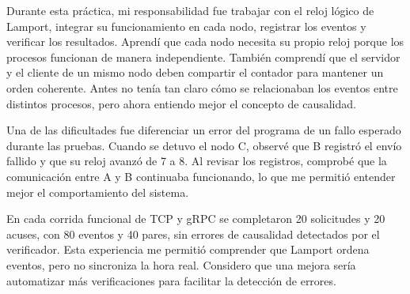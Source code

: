 Durante esta práctica, mi responsabilidad fue trabajar con el reloj lógico de
Lamport, integrar su funcionamiento en cada nodo, registrar los eventos y verificar
los resultados. Aprendí que cada nodo necesita su propio reloj porque los procesos
funcionan de manera independiente. También comprendí que el servidor y el cliente
de un mismo nodo deben compartir el contador para mantener un orden coherente.
Antes no tenía tan claro cómo se relacionaban los eventos entre distintos procesos,
pero ahora entiendo mejor el concepto de causalidad.

Una de las dificultades fue diferenciar un error del programa de un fallo esperado
durante las pruebas. Cuando se detuvo el nodo C, observé que B registró el envío
fallido y que su reloj avanzó de 7 a 8. Al revisar los registros, comprobé que la
comunicación entre A y B continuaba funcionando, lo que me permitió entender mejor
el comportamiento del sistema.

En cada corrida funcional de TCP y gRPC se completaron 20 solicitudes y 20 acuses,
con 80 eventos y 40 pares, sin errores de causalidad detectados por el verificador.
Esta experiencia me permitió comprender que Lamport ordena eventos, pero no
sincroniza la hora real. Considero que una mejora sería automatizar más
verificaciones para facilitar la detección de errores.

